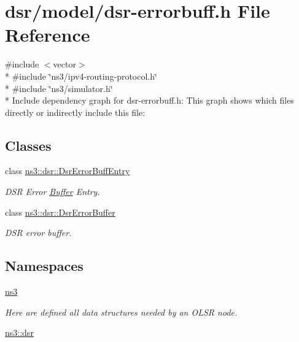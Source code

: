 \hypertarget{dsr-errorbuff_8h}{}\section{dsr/model/dsr-\/errorbuff.h File Reference}
\label{dsr-errorbuff_8h}
{\ttfamily \#include $<$vector$>$}\\*
{\ttfamily \#include \char`\"{}ns3/ipv4-\/routing-\/protocol.\+h\char`\"{}}\\*
{\ttfamily \#include \char`\"{}ns3/simulator.\+h\char`\"{}}\\*
Include dependency graph for dsr-\/errorbuff.h\+:
This graph shows which files directly or indirectly include this file\+:
\subsection*{Classes}
\begin{DoxyCompactItemize}
\item 
class \hyperlink{classns3_1_1dsr_1_1DsrErrorBuffEntry}{ns3\+::dsr\+::\+Dsr\+Error\+Buff\+Entry}
\begin{DoxyCompactList}\small\item\em D\+SR Error \hyperlink{classns3_1_1Buffer}{Buffer} Entry. \end{DoxyCompactList}\item 
class \hyperlink{classns3_1_1dsr_1_1DsrErrorBuffer}{ns3\+::dsr\+::\+Dsr\+Error\+Buffer}
\begin{DoxyCompactList}\small\item\em D\+SR error buffer. \end{DoxyCompactList}\end{DoxyCompactItemize}
\subsection*{Namespaces}
\begin{DoxyCompactItemize}
\item 
 \hyperlink{namespacens3}{ns3}
\begin{DoxyCompactList}\small\item\em Here are defined all data structures needed by an O\+L\+SR node. \end{DoxyCompactList}\item 
 \hyperlink{namespacens3_1_1dsr}{ns3\+::dsr}
\end{DoxyCompactItemize}

